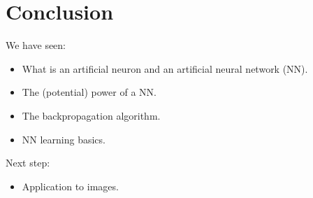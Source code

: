 \documentclass{book}
\begin{document}
\chapter{Conclusion}

We have seen:
\begin{itemize}
\item What is an artificial neuron and an artificial neural network (NN).
\item The (potential) power of a NN.
\item The backpropagation algorithm.
\item NN learning basics.
\end{itemize}

Next step:
\begin{itemize}
\item Application to images.
\end{itemize}



\end{document}
